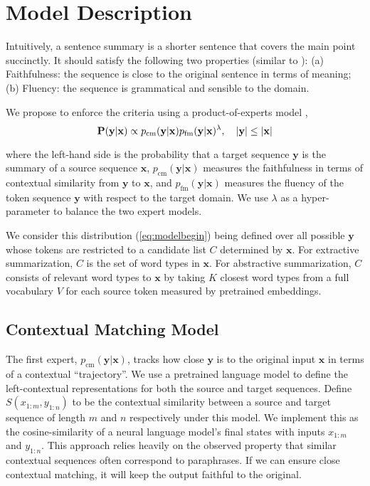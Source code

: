 \documentclass[11pt,a4paper]{article}
\newcommand{\prob}[2][]{\text{\bf P}\ifthenelse{\not\equal{}{#1}}{_{#1}}{}\!\left(#2\right)}
\newcommand{\bx}{\mathbf{x}}
\newcommand{\by}{\mathbf{y}}
\newcommand{\ps}{p_{\mathrm{cm}}}
\newcommand{\pl}{p_{\mathrm{fm}}}
\newcommand{\cc}{C}
\begin{document}
\section{Model Description}
Intuitively, a sentence summary is a shorter sentence that covers the main point succinctly. 
It should satisfy the following two properties (similar to \citet{pitler2010methods}): 
(a) Faithfulness: the sequence is close to the original sentence in terms of meaning;
(b) Fluency: the sequence is grammatical and sensible to the domain.

We propose to enforce the criteria using a product-of-experts model \cite{hinton2002training},
\begin{equation}\label{eq:modelbegin}
    \prob{\by|\bx} \propto \ps(\by|\bx)\pl(\by|\bx)^{\lambda},\quad |\by| \leq |\bx|
\end{equation}

\noindent where the left-hand side is the probability that a target sequence $\by$ is the summary of a source sequence $\bx$, $\ps(\by|\bx)$ measures the faithfulness in terms of contextual similarity from $\by$ to $\bx$, and $\pl(\by|\bx)$ measures the fluency of the token sequence $\by$ with respect to the target domain. We use $\lambda$ as a hyper-parameter to balance the two expert models.



We consider this distribution (\ref{eq:modelbegin}) being defined over all possible $\by$ whose tokens are restricted to a candidate list $\cc$ determined by $\bx$. For extractive summarization, $\cc$ is the set of word types in $\bx$. For abstractive summarization, $\cc$ consists of relevant word types to $\bx$ 
by taking $K$ closest word types from a full vocabulary $V$ for each source token measured by pretrained embeddings.

\subsection{Contextual Matching Model}

The first expert, $\ps(\by|\bx)$, tracks how  close $\by$ is to the original input $\bx$ in terms of a 
contextual ``trajectory''. We use a pretrained language model to define the left-contextual representations for both 
the source and target sequences. Define $S(x_{1:m}, y_{1:n})$ to be the contextual similarity between a source and target sequence of length $m$ and $n$ respectively under this model. We implement this as the cosine-similarity of a neural language model's final states with inputs $x_{1:m}$ and $y_{1:n}$. This approach relies heavily on the observed property that similar contextual sequences often correspond to paraphrases. If we can ensure close contextual matching, it will keep the output faithful to the original.
\end{document}
